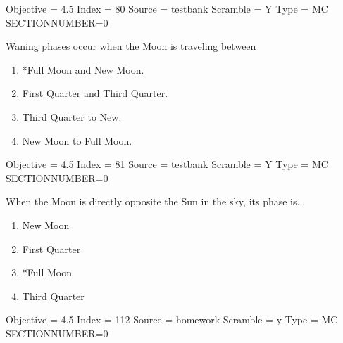 \documentclass[11pt]{article}
\begin{document}
\begin{enumerate}
\begin{minipage}{\textwidth}
\begin{minipage}{\textwidth}
Objective = 4.5
Index = 80
Source = testbank
Scramble = Y
Type = MC
SECTIONNUMBER=0
\end{minipage}
\end{minipage}
\vskip 0.20in

\begin{minipage}{\textwidth}
\begin{minipage}{\textwidth}
\item Waning phases occur when the Moon is traveling between
\begin{multicols}{2}
\begin{enumerate} 
\setlength{\itemsep}{1pt} 
\setlength{\parskip}{0pt} 
\setlength{\parsep}{0pt}
\setlength{\multicolsep}{1pt} 
\item *Full Moon and New Moon.
\item First Quarter and Third Quarter.
\item Third Quarter to New.
\item New Moon to Full Moon.
\end{enumerate} 
\vfill 
\end{multicols}

Objective = 4.5
Index = 81
Source = testbank
Scramble = Y
Type = MC
SECTIONNUMBER=0
\end{minipage}
\end{minipage}
\vskip 0.20in

\begin{minipage}{\textwidth}
\begin{minipage}{\textwidth}
\item When the Moon is directly opposite the Sun in the sky, its phase is...
\begin{multicols}{3}
\begin{enumerate} 
\setlength{\itemsep}{1pt} 
\setlength{\parskip}{0pt} 
\setlength{\parsep}{0pt}
\setlength{\multicolsep}{1pt} 
\item New Moon
\item First Quarter
\item *Full Moon
\item Third Quarter
\end{enumerate} 
\vfill 
\end{multicols}

Objective = 4.5
Index = 112
Source = homework
Scramble = y
Type = MC
SECTIONNUMBER=0
\end{minipage}
\end{minipage}
\vskip 0.20in


\end{enumerate}
\end{document}
